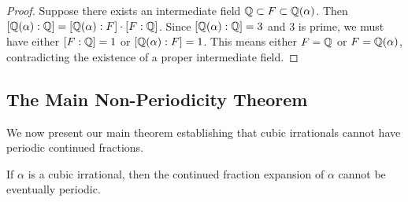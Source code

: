 \begin{proof}
Suppose there exists an intermediate field $\mathbb{Q} \subset F \subset \mathbb{Q}(\alpha)$. Then $[\mathbb{Q}(\alpha):\mathbb{Q}] = [\mathbb{Q}(\alpha):F] \cdot [F:\mathbb{Q}]$. Since $[\mathbb{Q}(\alpha):\mathbb{Q}] = 3$ and 3 is prime, we must have either $[F:\mathbb{Q}] = 1$ or $[\mathbb{Q}(\alpha):F] = 1$. This means either $F = \mathbb{Q}$ or $F = \mathbb{Q}(\alpha)$, contradicting the existence of a proper intermediate field.
\end{proof}

\subsection{The Main Non-Periodicity Theorem}

We now present our main theorem establishing that cubic irrationals cannot have periodic continued fractions.

\begin{theorem}\label{thm:non_periodicity}
If $\alpha$ is a cubic irrational, then the continued fraction expansion of $\alpha$ cannot be eventually periodic.
\end{theorem}

